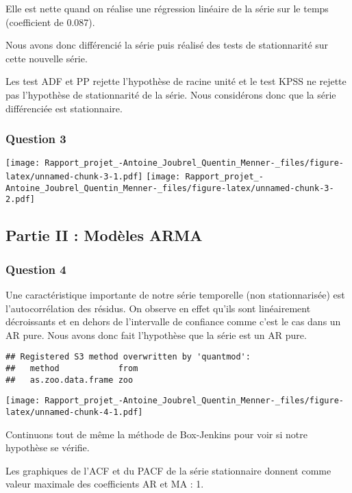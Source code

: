 \documentclass[
  landscape]{article}
\begin{document}
Elle est nette quand on réalise une régression linéaire de la série sur
le temps (coefficient de 0.087).

Nous avons donc différencié la série puis réalisé des tests de
stationnarité sur cette nouvelle série.

Les test ADF et PP rejette l'hypothèse de racine unité et le test KPSS
ne rejette pas l'hypothèse de stationnarité de la série. Nous
considérons donc que la série différenciée est stationnaire.

\hypertarget{question-3}{%
\subsubsection{Question 3}\label{question-3}}

\texttt{[image: Rapport\_projet\_-Antoine\_Joubrel\_Quentin\_Menner-\_files/figure-latex/unnamed-chunk-3-1.pdf]}
\texttt{[image: Rapport\_projet\_-Antoine\_Joubrel\_Quentin\_Menner-\_files/figure-latex/unnamed-chunk-3-2.pdf]}

\hypertarget{partie-ii-moduxe8les-arma}{%
\subsection{Partie II : Modèles ARMA}\label{partie-ii-moduxe8les-arma}}

\hypertarget{question-4}{%
\subsubsection{Question 4}\label{question-4}}

Une caractéristique importante de notre série temporelle (non
stationnarisée) est l'autocorrélation des résidus. On observe en effet
qu'ils sont linéairement décroissants et en dehors de l'intervalle de
confiance comme c'est le cas dans un AR pure. Nous avons donc fait
l'hypothèse que la série est un AR pure.

\begin{verbatim}
## Registered S3 method overwritten by 'quantmod':
##   method            from
##   as.zoo.data.frame zoo
\end{verbatim}

\texttt{[image: Rapport\_projet\_-Antoine\_Joubrel\_Quentin\_Menner-\_files/figure-latex/unnamed-chunk-4-1.pdf]}

Continuons tout de même la méthode de Box-Jenkins pour voir si notre
hypothèse se vérifie.

Les graphiques de l'ACF et du PACF de la série stationnaire donnent
comme valeur maximale des coefficients AR et MA : 1.
\end{document}
